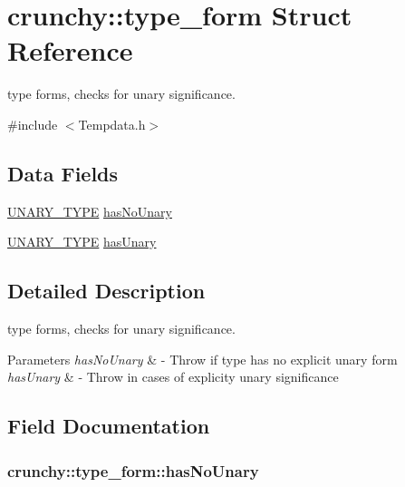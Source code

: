 \hypertarget{structcrunchy_1_1type__form}{}\section{crunchy\+:\+:type\+\_\+form Struct Reference}
\label{structcrunchy_1_1type__form}


type forms, checks for unary significance.  




{\ttfamily \#include $<$Tempdata.\+h$>$}

\subsection*{Data Fields}
\begin{DoxyCompactItemize}
\item 
\hyperlink{_tempdata_8h_af66cdd64c4d0c558d4cb016c4e0d6694}{U\+N\+A\+R\+Y\+\_\+\+T\+Y\+P\+E} \hyperlink{structcrunchy_1_1type__form_a5941739fb7b37a91b52fe240614aa388}{has\+No\+Unary}
\item 
\hyperlink{_tempdata_8h_af66cdd64c4d0c558d4cb016c4e0d6694}{U\+N\+A\+R\+Y\+\_\+\+T\+Y\+P\+E} \hyperlink{structcrunchy_1_1type__form_a78a0fdae7e17412ea3a5374fa7d0925c}{has\+Unary}
\end{DoxyCompactItemize}


\subsection{Detailed Description}
type forms, checks for unary significance. 


\begin{DoxyParams}{Parameters}
{\em has\+No\+Unary} & -\/ Throw if type has no explicit unary form \\
\hline
{\em has\+Unary} & -\/ Throw in cases of explicity unary significance \\
\hline
\end{DoxyParams}


\subsection{Field Documentation}
\hypertarget{structcrunchy_1_1type__form_a5941739fb7b37a91b52fe240614aa388}{}
\subsubsection[{has\+No\+Unary}]{ crunchy\+::type\+\_\+form\+::has\+No\+Unary}\label{structcrunchy_1_1type__form_a5941739fb7b37a91b52fe240614aa388}
\hypertarget{structcrunchy_1_1type__form_a78a0fdae7e17412ea3a5374fa7d0925c}{}
